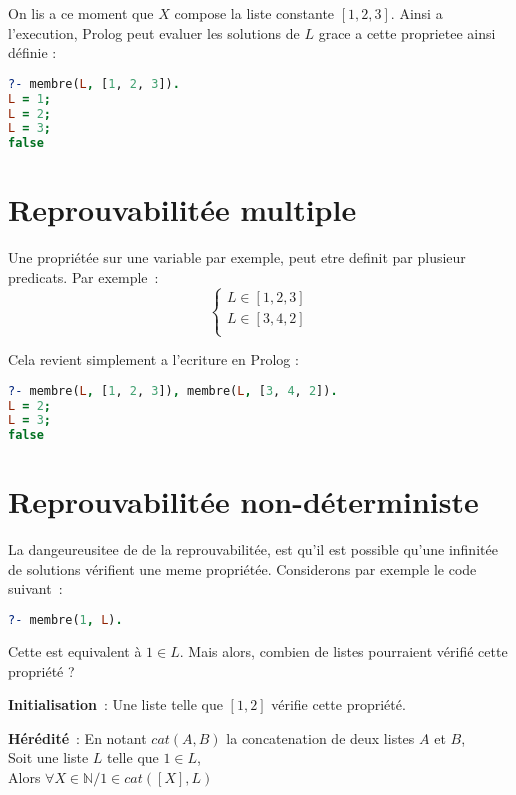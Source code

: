 On lis a ce moment que $X$ compose la liste constante $[1, 2, 3]$. Ainsi a
l'execution, Prolog peut evaluer les solutions de $L$ grace a cette proprietee
ainsi définie :

\begin{lstlisting}[language=Prolog,frame=single]
?- membre(L, [1, 2, 3]).
L = 1;
L = 2;
L = 3;
false
\end{lstlisting}


\section{Reprouvabilitée multiple}

Une propriétée sur une variable par exemple, peut etre definit par plusieur
predicats. Par exemple~:
\[
    \left\{  
    \begin{array}{c}
        L \in [1, 2, 3]\\
        L \in [3, 4, 2]\\
    \end{array}
    \right .
\]

Cela revient simplement a l'ecriture en Prolog :
\begin{lstlisting}[language=Prolog,frame=single]
?- membre(L, [1, 2, 3]), membre(L, [3, 4, 2]).
L = 2;
L = 3;
false
\end{lstlisting}


\section{Reprouvabilitée non-déterministe}

La dangeureusitee de de la reprouvabilitée, est qu'il est possible qu'une
infinitée de solutions vérifient une meme propriétée. Considerons par exemple
le code suivant~:

\begin{lstlisting}[language=Prolog,frame=single]
?- membre(1, L).
\end{lstlisting}

Cette est equivalent à $1 \in L$. Mais alors, combien de listes
pourraient vérifié cette propriété ?

\textbf{Initialisation}~: Une liste telle que $[1, 2]$ vérifie cette propriété.

\textbf{Hérédité}~: En notant $cat(A, B)$ la concatenation de deux listes $A$ et
$B$,\\
Soit une liste $L$ telle que $1 \in L$,\\
Alors $\forall X \in \mathbb{N} / 1 \in cat([X], L)$

